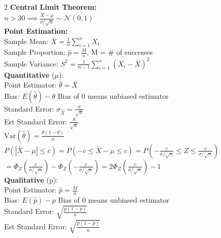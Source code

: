 \documentclass[10pt,letterpaper]{article}
\begin{document}
\begin{multicols}{2}
\textbf{Central Limit Theorem:}\\
$n > 30 \implies \frac{\bar{X} - \mu}{\sigma / \sqrt{n}} \sim \mathcal{N}(0, 1)$\\
\textbf{Point Estimation:}\\
Sample Mean: $\bar{X} = \frac{1}{n} \sum_{i=1}^n X_i$\\
Sample Proportion: $\hat{p} = \frac{M}{n}$, M = \# of successes\\
Sample Variance: $S^2 = \frac{1}{n-1} \sum_{i=1}^n (X_i - \bar{X})^2$\\
\textbf{Quantitative} ($\mu$):\\
Point Estimator: $\hat{\theta} = \bar{X}$\\
Bias: $E(\hat{\theta}) - \theta$ Bias of 0 means unbiased estimator\\
Standard Error: $\sigma_{\hat{X}} = \frac{\sigma}{\sqrt{n}}$\\
Est Standard Error: $\frac{S}{\sqrt{n}}$\\
$\text{Var}(\hat{\theta}) = \frac{\theta(1-\theta)}{n}$\\
$P(|\bar{X} - \mu| \leq c) = P(-c \leq \bar{X} - \mu \leq c) = P\left(-\frac{c}{\sigma / \sqrt{n}} \leq Z \leq \frac{c}{\sigma / \sqrt{n}}\right)$\\
$= \Phi_Z\left(\frac{c}{\sigma / \sqrt{n}}\right) - \Phi_Z\left(-\frac{c}{\sigma / \sqrt{n}}\right) = 2\Phi_Z\left(\frac{c}{\sigma / \sqrt{n}}\right) - 1$\\
\textbf{Qualitative} (p):\\
Point Estimator: $\hat{p} = \frac{M}{n}$\\
Bias: $E(\hat{p}) - p$ Bias of 0 means unbiased estimator\\
Standard Error: $\sqrt{\frac{p(1-p)}{n}}$\\
Est Standard Error: $\sqrt{\frac{\hat{p}(1-\hat{p})}{n}}$

\vspace{1cm}


\end{multicols}
\end{document}
